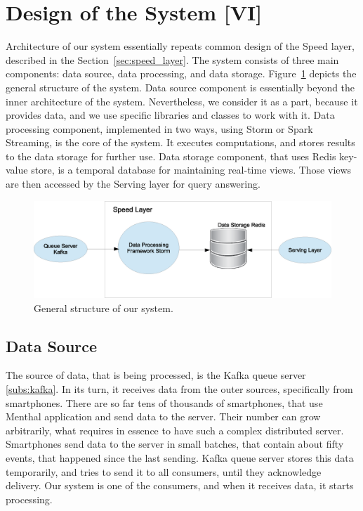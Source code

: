 \section{Design of the System [VI]}

Architecture of our system essentially repeats common design of the Speed layer, described in the Section~\ref{sec:speed_layer}.
The system consists of three main components: data source, data processing, and data storage.
Figure~\ref{fig:SpeedLayerArchitecture} depicts the general structure of the system.
Data source component is essentially beyond the inner architecture of the system.
Nevertheless, we consider it as a part, because it provides data, and we use specific libraries and classes to work with it.
Data processing component, implemented in two ways, using Storm or Spark Streaming, is the core of the system.
It executes computations, and stores results to the data storage for further use.
Data storage component, that uses Redis key-value store, is a temporal database for maintaining real-time views.
Those views are then accessed by the Serving layer for query answering.

\begin{figure}[h]
  \centering
  \includegraphics [width=1.0\textwidth]{images/SpeedLayerArchitecture}
  \caption{General structure of our system.}
  \label{fig:SpeedLayerArchitecture}
\end{figure}

\subsection{Data Source}

The source of data, that is being processed, is the Kafka queue server \ref{subs:kafka}.
In its turn, it receives data from the outer sources, specifically from smartphones.
There are so far tens of thousands of smartphones, that use Menthal application and send data to the server.
Their number can grow arbitrarily, what requires in essence to have such a complex distributed server.
Smartphones send data to the server in small batches, that contain about fifty events, that happened since the last sending.
Kafka queue server stores this data temporarily, and tries to send it to all consumers, until they acknowledge delivery.
Our system is one of the consumers, and when it receives data, it starts processing. 

